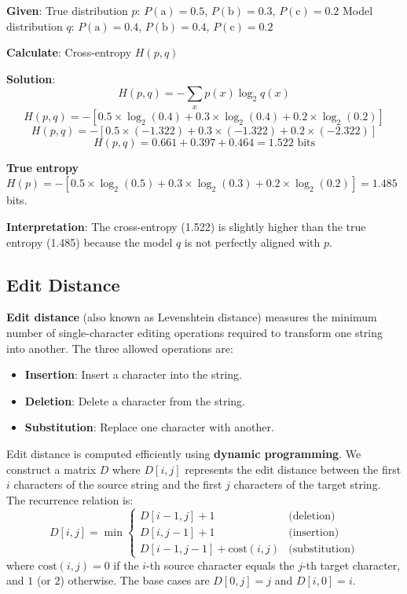 \documentclass[11pt,a4paper]{article}
\begin{document}
\begin{tcolorbox}[colback=green!5!white,colframe=green!75!black,title=\textbf{Worked Example 13: Cross-Entropy Between True and Estimated Distributions}]
\textbf{Given}: True distribution $p$: $P(\text{a}) = 0.5$, $P(\text{b}) = 0.3$, $P(\text{c}) = 0.2$
Model distribution $q$: $P(\text{a}) = 0.4$, $P(\text{b}) = 0.4$, $P(\text{c}) = 0.2$

\textbf{Calculate}: Cross-entropy $H(p, q)$

\textbf{Solution}:
\[
H(p, q) = -\sum_x p(x) \log_2 q(x)
\]
\[
H(p, q) = -[0.5 \times \log_2(0.4) + 0.3 \times \log_2(0.4) + 0.2 \times \log_2(0.2)]
\]
\[
H(p, q) = -[0.5 \times (-1.322) + 0.3 \times (-1.322) + 0.2 \times (-2.322)]
\]
\[
H(p, q) = 0.661 + 0.397 + 0.464 = 1.522 \text{ bits}
\]

\textbf{True entropy} $H(p) = -[0.5 \times \log_2(0.5) + 0.3 \times \log_2(0.3) + 0.2 \times \log_2(0.2)] = 1.485$ bits.

\textbf{Interpretation}: The cross-entropy (1.522) is slightly higher than the true entropy (1.485) because the model $q$ is not perfectly aligned with $p$.
\end{tcolorbox}

\subsection{Edit Distance}

\textbf{Edit distance} (also known as Levenshtein distance) measures the minimum number of single-character editing operations required to transform one string into another. The three allowed operations are:
\begin{itemize}
    \item \textbf{Insertion}: Insert a character into the string.
    \item \textbf{Deletion}: Delete a character from the string.
    \item \textbf{Substitution}: Replace one character with another.
\end{itemize}

Edit distance is computed efficiently using \textbf{dynamic programming}. We construct a matrix $D$ where $D[i, j]$ represents the edit distance between the first $i$ characters of the source string and the first $j$ characters of the target string. The recurrence relation is:
\[
D[i, j] = \min\begin{cases}
D[i-1, j] + 1 & \text{(deletion)} \\
D[i, j-1] + 1 & \text{(insertion)} \\
D[i-1, j-1] + \text{cost}(i,j) & \text{(substitution)}
\end{cases}
\]
where $\text{cost}(i,j) = 0$ if the $i$-th source character equals the $j$-th target character, and $1$ (or $2$) otherwise. The base cases are $D[0, j] = j$ and $D[i, 0] = i$.
\end{document}
